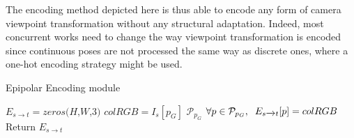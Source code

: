 The encoding method depicted here is thus able to encode any form of camera viewpoint transformation without any structural adaptation. Indeed, most concurrent works need to change the way viewpoint transformation is encoded since continuous poses are not processed the same way as discrete ones, where a one-hot encoding strategy might be used. 

\begin{algorithm}[h!]
\caption{Epipolar Encoding module \label{pseudoCode}}
\begin{algorithmic}[1]
\State $E_{s\xrightarrow{}t} = \textit{zeros(H,W,3)}$
\State $colRGB=I_{s}[p_{G}]$
\State {} $\mathcal{P}_{p_{G}}$
\State $\forall p \in \mathcal{P}_{p_{G}},\hspace{.2cm} E_{s\xrightarrow{}t}[p]=colRGB$
\EndFor
\State Return $E_{s\xrightarrow{}t}$
\EndProcedure
\end{algorithmic}
\end{algorithm}

